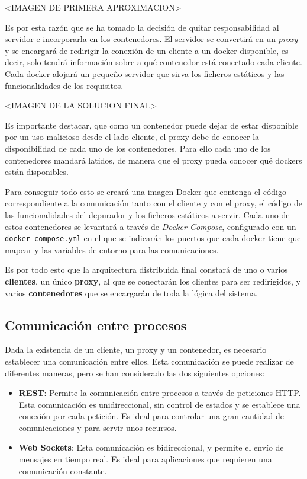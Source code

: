 <IMAGEN DE PRIMERA APROXIMACION>

Es por esta razón que se ha tomado la decisión de quitar responsabilidad al servidor e incorporarla en los contenedores. El servidor se convertirá en un \textit{proxy} y se encargará de redirigir la conexión de un cliente a un docker disponible, es decir, solo tendrá información sobre a qué contenedor está conectado cada cliente. 
Cada docker alojará un pequeño servidor que sirva los ficheros estáticos y las funcionalidades de los requisitos.

<IMAGEN DE LA SOLUCION FINAL>

Es importante destacar, que como un contenedor puede dejar de estar disponible por un uso malicioso desde el lado cliente, el proxy debe de conocer la disponibilidad de cada uno de los contenedores. Para ello cada uno de los contenedores mandará latidos, de manera que el proxy pueda conocer qué dockers están disponibles.

Para conseguir todo esto se creará una imagen Docker que contenga el código correspondiente a la comunicación tanto con el cliente y con el proxy, el código de las funcionalidades del depurador y los ficheros estáticos a servir.
Cada uno de estos contenedores se levantará a través de \textit{Docker Compose}, configurado con un \texttt{docker-compose.yml} en el que se indicarán los puertos que cada docker tiene que mapear y las variables de entorno para las comunicaciones. 

Es por todo esto que la arquitectura distribuida final constará de uno o varios \textbf{clientes}, un único \textbf{proxy}, al que se conectarán los clientes para ser redirigidos, y varios \textbf{contenedores} que se encargarán de toda la lógica del sistema.

\subsection{Comunicación entre procesos} \label{subsec:comunicacion-procesos}

Dada la existencia de un cliente, un proxy y un contenedor, es necesario establecer una comunicación entre ellos. Esta comunicación se puede realizar de diferentes maneras, pero se han considerado las dos siguientes opciones: 

\begin{itemize}
    \item \textbf{REST}: Permite la comunicación entre procesos a través de peticiones HTTP. Esta comunicación es unidireccional, sin control de estados y se establece una conexión por cada petición. Es ideal para controlar una gran cantidad de comunicaciones y para servir unos recursos.
    \item \textbf{Web Sockets}: Esta comunicación es bidireccional, y permite el envío de mensajes en tiempo real. Es ideal para aplicaciones que requieren una comunicación constante.
\end{itemize}

